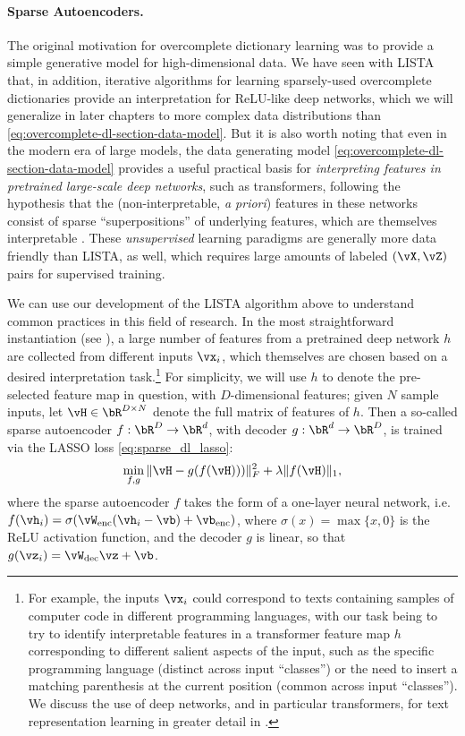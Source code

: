 \documentclass[../../book-main.tex]{subfiles}
\begin{document}
\paragraph{Sparse Autoencoders.}
The original motivation for overcomplete dictionary learning was to provide
a simple generative model for high-dimensional data. We have seen with LISTA that, in
addition, iterative algorithms for learning sparsely-used overcomplete
dictionaries provide an interpretation for ReLU-like deep networks, which we
will generalize in later chapters to more complex data distributions than
\eqref{eq:overcomplete-dl-section-data-model}.
But it is also worth noting that even in the modern era of large models, the data
generating model \eqref{eq:overcomplete-dl-section-data-model} provides a useful
practical basis for
\textit{interpreting features in pretrained large-scale deep networks}, such as
transformers, following the hypothesis that the (non-interpretable, \textit{a
priori}) features in these networks consist of sparse ``superpositions'' of
underlying features, which are themselves interpretable
\cite{elhage2022superposition}. These \textit{unsupervised} learning paradigms
are generally more data friendly than LISTA, as well, which requires large amounts
of labeled $(\vX, \vZ)$ pairs for supervised training.

We can use our development of the LISTA algorithm above to understand common
practices in this field of research.
In the most straightforward instantiation (see \citep{huben2024sparse,
gao2025scaling}), a large number of features from a pretrained deep network $h$
are collected from different inputs $\vx_i$, which themselves are chosen based
on a desired interpretation task.\footnote{For example, the inputs $\vx_i$ could
correspond to texts containing samples of computer code in different programming
languages, with our task being to try to identify interpretable features in
a transformer feature map $h$ corresponding to different salient aspects of the
input, such as the specific programming language (distinct across input
``classes'') or the need to insert a matching parenthesis at the current
position (common across input ``classes''). We discuss the use of deep networks,
and in particular transformers, for text representation
learning in greater detail in .} For
simplicity, we will use $h$ to denote the pre-selected feature map in question,
with $D$-dimensional features; given $N$ sample inputs, let $\vH \in \bR^{D
\times N}$ denote the full matrix of features of $h$.
Then a so-called sparse autoencoder $f : \bR^D \to \bR^d$, with decoder $g : \bR^d \to
\bR^D$, is trained via the LASSO loss \eqref{eq:sparse_dl_lasso}:
\begin{equation}\label{eq:sae-loss}
  \min_{f, g} \| \vH - g(f(\vH))) \|_F^2 + \lambda \|f(\vH)\|_1 ,
\end{equation}
where the sparse autoencoder $f$ takes the form of a one-layer neural
network, i.e.\ $f(\vh_i) = \sigma(\vW_{\mathrm{enc}}(\vh_i - \vb)
+ \vb_{\mathrm{enc}})$, where $\sigma(x) = \max \{x, 0\}$ is the ReLU activation
function, and the decoder $g$ is linear, so that $g(\vz_i)
= \vW_{\mathrm{dec}}\vz + \vb$.
\end{document}
